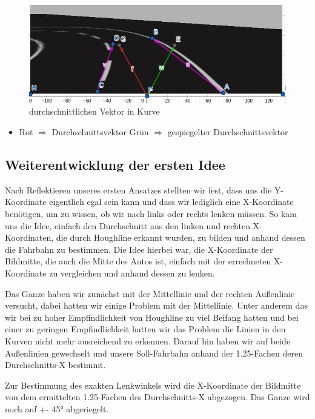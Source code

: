 \begin{figure}[H]
	\centering	
	\includegraphics[width=.5\textwidth]{img/vector_kurve}
	\caption[durchschnittlicher Vektor in Kurve]{durchschnittlichen Vektor in Kurve}
	\label{fig:vector_kurve}
\end{figure}

\begin{itemize}
			\item \color{red} Rot $\Rightarrow$ Durchschnittsvektor 	\qquad \color{green} Grün $\Rightarrow$ gespiegelter Durchschnittsvektor
			
\end{itemize}



\subsection{Weiterentwicklung der ersten Idee}
Nach Reflektieren unseres ersten Ansatzes stellten wir fest, dass uns die Y-Koordinate eigentlich egal sein kann und dass wir lediglich eine X-Koordinate benötigen, um zu wissen, ob wir nach links oder rechts lenken müssen. So kam uns die Idee, einfach den Durchschnitt aus den linken und rechten X-Koordinaten, die durch Houghline erkannt wurden, zu bilden und anhand dessen die Fahrbahn zu bestimmen. Die Idee hierbei war, die X-Koordinate der Bildmitte, die auch die Mitte des Autos ist, einfach mit der errechneten X-Koordinate zu vergleichen und anhand dessen zu lenken.

Das Ganze haben wir zunächst mit der Mittellinie und der rechten Außenlinie versucht, dabei hatten wir einige Problem mit der Mittellinie. Unter anderem das wir bei zu hoher Empfindlichkeit von Houghline zu viel Beifang hatten und bei einer zu geringen Empfindlichkeit hatten wir das Problem die Linien in den Kurven nicht mehr ausreichend zu erkennen. Darauf hin haben wir auf beide Außenlinien gewechselt und unsere Soll-Fahrbahn anhand der 1.25-Fachen deren Durchschnitts-X bestimmt.

Zur Bestimmung des exakten Lenkwinkels wird die X-Koordinate der Bildmitte von dem ermittelten 1.25-Fachen des Durchschnitts-X abgezogen. Das Ganze wird noch auf +- 45° abgeriegelt.


